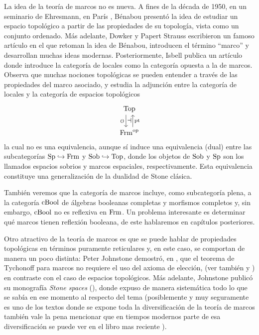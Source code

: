 La idea de la teoría de marcos no es nueva.
A fines de la década de 1950, en un seminario de Ehresmann,
en París \cite{Gattungen}, Bénabou
presentó la idea de estudiar un espacio topológico a partir
de las propiedades de su topología, vista como un conjunto ordenado.
Más adelante, Dowker y Papert Strauss escribieron un famoso artículo
\cite{Quotients}
en el que retoman la idea de Bénabou, introducen el término ``marco''
y desarrollan muchas ideas modernas.
Posteriormente, Isbell publica un artículo \cite{atomless-parts}
donde introduce
la categoría de locales como la categoría opuesta a la de marcos.
Observa que muchas nociones topológicas se pueden entender
a través de las propiedades del marco asociado,
y estudia la adjunción entre la categoría de locales y la categoría
de espacios topológicos
\[
    \begin{tikzcd}
        \Top \ar[d,"\cal O"'{name=izq},shift right=2] \\
        \Frm^\op \ar[u,"\pt"'{name=der},shift right=2]
        \adj{izq}{der}
    \end{tikzcd}
\]
la cual no es una equivalencia,
aunque sí induce una equivalencia (dual) entre las subcategorías
$\mathrm{Sp}\hookrightarrow\mathrm{Frm}$ y $\mathrm{Sob}\hookrightarrow\mathrm{Top}$,
donde los objetos de $\mathrm{Sob}$ y $\mathrm{Sp}$ son los llamados espacios sobrios
y marcos espaciales, respectivamente.
Esta equivalencia constituye una generalización de la dualidad
de Stone clásica.

También veremos que la categoría de marcos incluye,
como subcategoría plena, a la categoría $\mathrm{cBool}$ de álgebras booleanas
completas y morfismos completos y, sin embargo, $\mathrm{cBool}$ no es reflexiva
en $\mathrm{Frm}$.
Un problema interesante es determinar qué marcos tienen reflexión booleana, de este hablaremos en capítulos posteriores.


Otro atractivo de la teoría de marcos es que se puede hablar
de propiedades topológicas en términos puramente reticulares y,
en este caso, se comportan de manera un poco distinta:
Peter Johnstone demostró, en \cite{johnstone1981tychonoff}, que el teorema de Tychonoff
para marcos no requiere el uso del axioma de elección, (ver también \cite{banaschewski1988another} y \cite{kvrivz1985constructive})
en contraste con el caso de espacios topológicos.
Más adelante, Johnstone publicó su monografía \emph{Stone spaces} (\cite{johnstone1986stone}),
donde expuso de manera sistemática todo lo que se sabía en ese momento
al respecto del tema (posiblemente y muy seguramente es uno de los textos donde se expone 
toda la diversificación de la teoría de marcos también vale la pena mencionar que en tiempos modernos parte de esa diversificación se puede ver en el libro mas reciente \cite{picado2021separation}).

